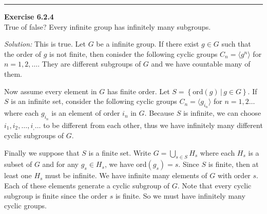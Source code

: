 \documentclass[a4paper, 12pt]{article}
\newenvironment{problem}[2][Exercise]
    { \begin{mdframed}[backgroundcolor=gray!20] \textbf{#1 #2} \\}
    {  \end{mdframed}}
\newenvironment{solution}
    {\textit{Solution:}}
    {}
\begin{document}
\noindent\rule{7in}{2.8pt}
\begin{problem}{6.2.4}
True of false? Every infinite group has infinitely many subgroups.
\end{problem}
\begin{solution}
This is true. Let \(G\) be a infinite group. If there exist \(g\in G\) such that the order of \(g\) is not finite, then conisder the following cyclic groups \(C_n=\langle g^n\rangle\) for 
\(n=1,2,\ldots\). They are different subgroups of \(G\) and we have countable many of them. 

Now assume every element in \(G\) has finite order. Let \(S=\left\{ \text{ord}(g)\,|\, g\in G \right\}\). If \(S\) 
is an infinite set, consider the following cyclic groups \(C_n=\langle g_{i_n}\rangle\) for \(n=1,2\ldots\) where each \(g_{i_n}\) is an element of order \(i_n\) in \(G\). Because \(S\) is infinite, we can choose 
\(i_1,i_2,\ldots,i_,\ldots\) to be different from each other, thus we have infinitely many different cyclic subgroups of \(G\). 

Finally we suppose that \(S\) is a finite set. Write \(G=\bigcup_{s\in S} H_s\) where each 
\(H_s\) is a subset of \(G\) and for any \(g_s\in H_s\), we have \(\text{ord}(g_s)=s\). Since \(S\) is finite, then at least one \(H_s\) must be infinite. We have infinite many elements of \(G\) with order \(s\). Each of these elements generate a 
cyclic subgroup of \(G\). Note that every cyclic subgroup is finite since the order \(s\) is finite. So we must have infinitely many cyclic groups.
\end{solution}
\end{document}
